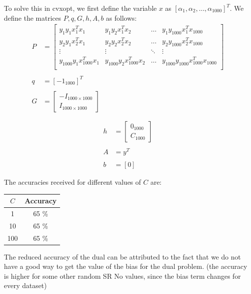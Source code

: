 \documentclass[12pt]{article}
\begin{document}
To solve this in cvxopt, we first define the variable $x$ as $[\alpha_1, \alpha_2, \dots ,\alpha_{1000}]^T$. We define the matrices $P, q, G, h, A, b$ as follows:
\begin{align*}
    P &= \begin{bmatrix}
        y_1y_1x_1^Tx_1 & y_1y_2x_1^Tx_2 & \dots & y_1y_{1000}x_1^Tx_{1000} \\
        y_2y_1x_2^Tx_1 & y_2y_2x_2^Tx_2 & \dots & y_2y_{1000}x_2^Tx_{1000} \\
        \vdots & \vdots & \ddots & \vdots \\
        y_{1000}y_1x_{1000}^Tx_1 & y_{1000}y_2x_{1000}^Tx_2 & \dots & y_{1000}y_{1000}x_{1000}^Tx_{1000} \\
    \end{bmatrix} \\ \\
    q &= [-1_{1000}]^T \\ \\
    G &= \begin{bmatrix}
        -I_{1000 \times 1000} \\
        I_{1000 \times 1000}
    \end{bmatrix} \\ \\
\end{align*}
\begin{align*}
    h &= \begin{bmatrix}
        0_{1000} \\
        C_{1000}
    \end{bmatrix} \\ \\
    A &= y^T \\ \\
    b &= [0]
\end{align*}

The accuracies received for different values of $C$ are:
\begin{center}
    \begin{tabular}{|c|c|}
        \hline
        $C$ & Accuracy \\
        \hline
        1 & 65 \% \\
        10 & 65 \% \\
        100 & 65 \% \\
        \hline
    \end{tabular}
\end{center}

The reduced accuracy of the dual can be attributed to the fact that we do not have a good way to get the value of the bias for the dual problem. (the accuracy is higher for some other random SR No values, since the bias term changes for every dataset)
\end{document}
